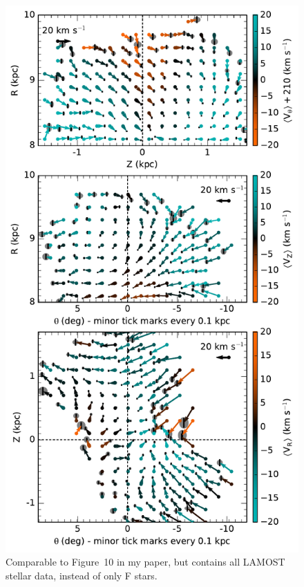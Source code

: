 \documentclass{article}
\begin{document}
\begin{figure}
\centering
\includegraphics[width=.7\textwidth]{sideviewL.pdf}
\caption{
	Comparable to Figure~10 in my paper, but contains all LAMOST stellar data, instead of only F stars. 
	\label{fig:sideviewL}
}
\end{figure}
\end{document}
